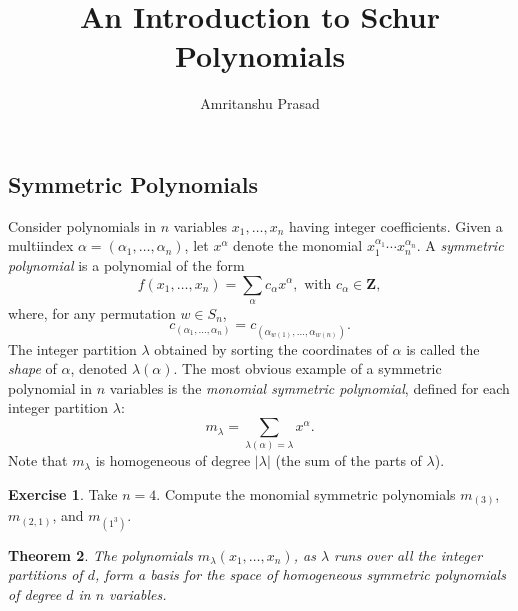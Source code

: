 \documentclass[11pt]{amsproc}
\title{An Introduction to Schur Polynomials}
\author{Amritanshu Prasad}
\newtheorem{theorem}{Theorem}[subsection]
\theoremstyle{definition}
\theoremstyle{example}
\newtheorem{exercise}[theorem]{Exercise}
\begin{document}
\maketitle
\setcounter{tocdepth}{2}
\tableofcontents
\subsection{Symmetric Polynomials}
\label{sec:symmetric-functions}
Consider polynomials in $n$ variables \linebreak $x_1,\dotsc,x_n$ having integer coefficients.
Given a multiindex $\alpha=(\alpha_1,\dotsc, \alpha_n)$, let $x^\alpha$ denote the monomial $x_1^{\alpha_1}\dotsb x_n^{\alpha_n}$.
A \emph{symmetric polynomial} is a polynomial of the form
\begin{displaymath}
  f(x_1,\dotsc, x_n) = \sum_{\alpha} c_\alpha x^\alpha, \text{ with } c_\alpha\in \mathbf Z,
\end{displaymath}
where, for any permutation $w\in S_n$,
\begin{displaymath}
  c_{(\alpha_1,\dotsc,\alpha_n)} = c_{(\alpha_{w(1)},\dotsc,\alpha_{w(n)})}.
\end{displaymath}
The integer partition $\lambda$ obtained by sorting the coordinates of $\alpha$  is called the \emph{shape} of $\alpha$, denoted $\lambda(\alpha)$.
The most obvious example of a symmetric polynomial in $n$ variables is the \emph{monomial symmetric polynomial}, defined for each integer partition $\lambda$:
\begin{displaymath}
  m_\lambda = \sum_{\lambda(\alpha) = \lambda} x^\alpha.
\end{displaymath}
Note that $m_\lambda$ is homogeneous of degree $|\lambda|$ (the sum of the parts of $\lambda$).
\begin{exercise}
  Take $n=4$. Compute the monomial symmetric polynomials $m_{(3)}$, $m_{(2,1)}$, and $m_{(1^3)}$.
\end{exercise}
\begin{theorem}
The polynomials $m_\lambda(x_1,\dotsc,x_n)$, as $\lambda$ runs over all the integer partitions of $d$, form a basis for the space of homogeneous symmetric polynomials of degree $d$ in $n$ variables.
\end{theorem}
\end{document}
